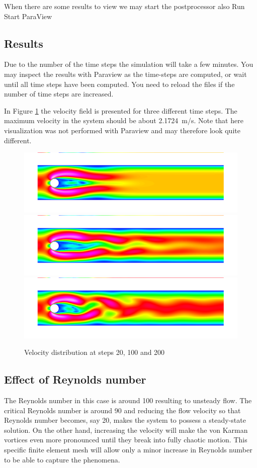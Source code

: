 When there are some results to view we may start the postprocessor also
\ttbegin
Run
  Start ParaView
\ttend


\subsection*{Results}

Due to the number of the time steps the simulation will take a few minutes.
You may inspect the results with Paraview as the time-steps are computed, or
wait until all time steps have been computed.
You need to reload the files if the number of time steps are increased.

In Figure \ref{fg:vonkarman_flow} the velocity field is presented for three different time steps.
The maximum velocity in the system should be about 2.1724~m/s. Note that here
visualization was not performed with Paraview and may therefore look quite different.

\begin{figure}[h]
\centering
\includegraphics[width=12cm, viewport=0 30 1089 270,clip]{flow20.png}
\includegraphics[width=12cm, viewport=0 30 1089 270,clip]{flow100.png}
\includegraphics[width=12cm, viewport=0 30 1089 270,clip]{flow200.png}
\caption{Velocity distribution at steps 20, 100 and 200}\label{fg:vonkarman_flow}
\end{figure} 


\subsection*{Effect of Reynolds number}
The Reynolds number in this case is around 100 resulting to unsteady flow.
The critical Reynolds number is around 90 and 
reducing the flow velocity so that Reynolds number becomes, say 20, makes the 
system to possess a steady-state solution. On the other hand, increasing the velocity will make the von Karman vortices
even more pronounced until they break into fully chaotic motion. This specific finite element mesh will allow only 
a minor increase in Reynolds number to be able to capture the phenomena. 

\hfill

